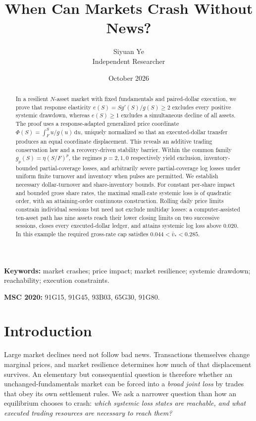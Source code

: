 \documentclass[11pt]{article}
\title{\textbf{When Can Markets Crash Without News?}}
\author{Siyuan Ye\\{\small Independent Researcher}}
\date{October 2026}
\numberwithin{equation}{section}
\theoremstyle{definition}
\theoremstyle{remark}
\begin{document}
\maketitle
\vspace{-0.95em}
\begin{abstract}\noindent
In a resilient $N$-asset market with fixed fundamentals and paired-dollar execution, we prove that response elasticity $e(S)=Sg'(S)/g(S)\ge2$ excludes every positive systemic drawdown, whereas $e(S)\ge1$ excludes a simultaneous decline of all assets. The proof uses a response-adapted generalized price coordinate $\Phi(S)=\int_F^S u/g(u)\,\mathrm{d}u$, uniquely normalized so that an executed-dollar transfer produces an equal coordinate displacement. This reveals an additive trading conservation law and a recovery-driven stability barrier. Within the common family $g_p(S)=\eta(S/F)^p$, the regimes $p=2,1,0$ respectively yield exclusion, inventory-bounded partial-coverage losses, and arbitrarily severe partial-coverage log losses under uniform finite turnover and inventory when pulses are permitted. We establish necessary dollar-turnover and share-inventory bounds. For constant per-share impact and bounded gross share rates, the maximal small-rate systemic loss is of quadratic order, with an attaining-order continuous construction. Rolling daily price limits constrain individual sessions but need not exclude multiday losses: a computer-assisted ten-asset path has nine assets reach their lower closing limits on two successive sessions, closes every executed-dollar ledger, and attains systemic log loss above $0.020$. In this example the required gross-rate cap satisfies $0.044<\bar v_*<0.285$.
\end{abstract}
\noindent\textbf{Keywords:} market crashes; price impact; market resilience; systemic drawdown; reachability; execution constraints.\par
\noindent\textbf{MSC 2020:} 91G15, 91G45, 93B03, 65G30, 91G80.

\section{Introduction}\label{sec:intro}
Large market declines need not follow bad news. Transactions themselves change marginal prices, and market resilience determines how much of that displacement survives. An elementary but consequential question is therefore whether an unchanged-fundamentals market can be forced into a \emph{broad joint loss} by trades that obey its own settlement rules. We ask a narrower question than how an equilibrium chooses to crash: \emph{which systemic loss states are reachable, and what executed trading resources are necessary to reach them?}
\end{document}
